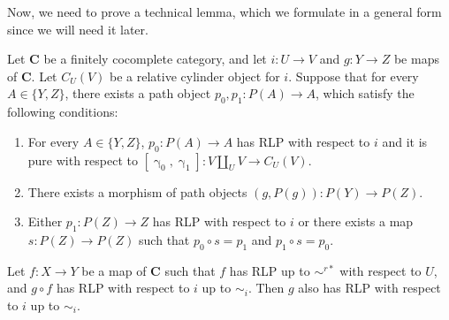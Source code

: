 \documentclass{tac}
\theoremstyle{definition}
\newcommand{\cat}[1]{\mathbf{#1}}
\newcommand{\C}{\cat{C}}
\newcommand{\cyli}{\upgamma}
\begin{document}
Now, we need to prove a technical lemma, which we formulate in a general form since we will need it later.

\begin{lem}[we-bot]
Let $\C$ be a finitely cocomplete category, and let $i : U \to V$ and $g : Y \to Z$ be maps of $\C$.
Let $C_U(V)$ be a relative cylinder object for $i$.
Suppose that for every $A \in \{ Y, Z \}$, there exists a path object $p_0,p_1 : P(A) \to A$, which satisfy the following conditions:
\begin{enumerate}
\item For every $A \in \{ Y, Z \}$, $p_0 : P(A) \to A$ has RLP with respect to $i$ and it is pure with respect to $[\cyli_0,\cyli_1] : V \amalg_U V \to C_U(V)$.
\item There exists a morphism of path objects $(g,P(g)) : P(Y) \to P(Z)$.
\item Either $p_1 : P(Z) \to Z$ has RLP with respect to $i$ or there exists a map $s : P(Z) \to P(Z)$ such that $p_0 \circ s = p_1$ and $p_1 \circ s = p_0$.
\end{enumerate}

Let $f : X \to Y$ be a map of $\C$ such that $f$ has RLP up to $\sim^{r*}$ with respect to $U$, and $g \circ f$ has RLP with respect to $i$ up to $\sim_i$.
Then $g$ also has RLP with respect to $i$ up to $\sim_i$.
\end{lem}
\end{document}
